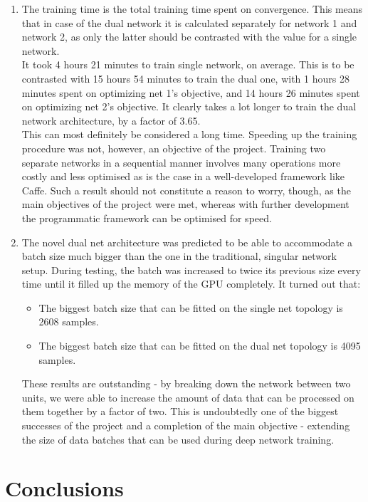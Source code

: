 \documentclass[letterpaper]{article}
\begin{document}
\begin{enumerate}
	\item The training time is the total training time spent on convergence. This means that in case of the dual network it is calculated separately for network 1 and network 2, as only the latter should be contrasted with the value for a single network.\\
	It took 4 hours 21 minutes to train single network, on average. This is to be contrasted with 15 hours 54 minutes to train the dual one, with 1 hours 28 minutes spent on optimizing net 1's objective, and 14 hours 26 minutes spent on optimizing net 2's objective. It clearly takes a lot longer to train the dual network architecture, by a factor of 3.65.\\
	This can most definitely be considered a long time. Speeding up the training procedure was not, however, an objective of the project. Training two separate networks in a sequential manner involves  many operations more costly and less optimised as is the case in a well-developed framework like Caffe. Such a result should not constitute a reason to worry, though, as the main objectives of the project were met, whereas with further development the programmatic framework can be optimised for speed.
	
	\item The novel dual net architecture was predicted to be able to accommodate a batch size much bigger than the one in the traditional, singular network setup. During testing, the batch was increased to twice its previous size every time until it filled up the memory of the GPU completely. It turned out that:
	\begin{itemize}
		\item The biggest batch size that can be fitted on the single net topology is 2608 samples.
		\item The biggest batch size that can be fitted on the dual net topology is 4095 samples.
	\end{itemize}
	
	These results are outstanding - by breaking down the network between two units, we were able to increase the amount of data that can be processed on them together by a factor of two. This is undoubtedly one of the biggest successes of the project and a completion of the main objective - extending the size of data batches that can be used during deep network training.
\end{enumerate}

\section{Conclusions}
\end{document}
